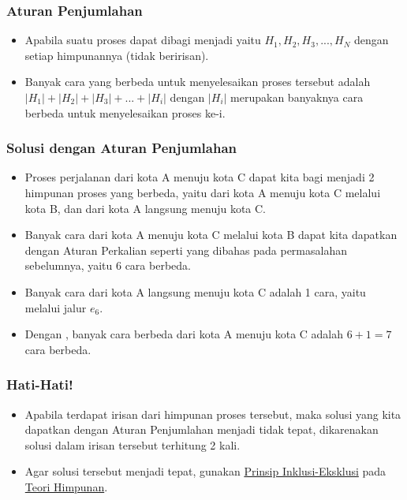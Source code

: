 \begin{frame}
\frametitle{Aturan Penjumlahan}
\begin{itemize}
  \item Apabila suatu proses dapat dibagi menjadi  yaitu $H_{1}, H_{2}, H_{3}, ... , H_{N}$ dengan setiap himpunannya  (tidak beririsan).
  \item Banyak cara yang berbeda untuk menyelesaikan proses tersebut adalah $|H_{1}| + |H_{2}| + |H_{3}| + ... + |H_{i}|$ dengan $|H_{i}|$ merupakan banyaknya cara berbeda untuk menyelesaikan proses ke-i.
\end{itemize}
\end{frame}

\begin{frame}
\frametitle{Solusi dengan Aturan Penjumlahan}
\begin{itemize}
  \item Proses perjalanan dari kota A menuju kota C dapat kita bagi menjadi 2 himpunan proses yang berbeda, yaitu dari kota A menuju kota C melalui kota B, dan dari kota A langsung menuju kota C.
  \item Banyak cara dari kota A menuju kota C melalui kota B dapat kita dapatkan dengan Aturan Perkalian seperti yang dibahas pada permasalahan sebelumnya, yaitu 6 cara berbeda.
  \item Banyak cara dari kota A langsung menuju kota C adalah 1 cara, yaitu melalui jalur $e_{6}$.
  \item Dengan , banyak cara berbeda dari kota A menuju kota C adalah $6 + 1 = 7$ cara berbeda.
\end{itemize}
\end{frame}

\begin{frame}
\frametitle{Hati-Hati!}
\begin{itemize}
  \item Apabila terdapat irisan dari himpunan proses tersebut, maka solusi yang kita dapatkan dengan Aturan Penjumlahan menjadi tidak tepat, dikarenakan solusi dalam irisan tersebut terhitung 2 kali.
  \item Agar solusi tersebut menjadi tepat, gunakan \textcolor{blue}{\href{https://en.wikipedia.org/wiki/Inclusion-exclusion\_principle}{Prinsip Inklusi-Eksklusi}} pada \textcolor{blue}{\href{https://id.wikipedia.org/wiki/Himpunan}{Teori Himpunan}}.
\end{itemize}
\end{frame}

